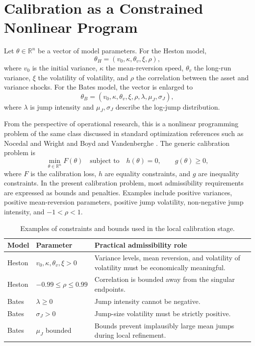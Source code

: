 \documentclass[a4paper,10pt,titlepage,oneside,openany]{book}
\theoremstyle{plain}
\theoremstyle{definition}
\theoremstyle{remark}
\newcommand{\R}{\mathbb{R}}
\begin{document}
\section{Calibration as a Constrained Nonlinear Program}

Let \(\theta\in\R^n\) be a vector of model parameters. For the Heston model,
\[
    \theta_H=(v_0,\kappa,\theta_v,\xi,\rho),
\]
where \(v_0\) is the initial variance, \(\kappa\) the mean-reversion speed, \(\theta_v\) the long-run variance, \(\xi\) the volatility of volatility, and \(\rho\) the correlation between the asset and variance shocks. For the Bates model, the vector is enlarged to
\[
    \theta_B=(v_0,\kappa,\theta_v,\xi,\rho,\lambda,\mu_J,\sigma_J),
\]
where \(\lambda\) is jump intensity and \(\mu_J,\sigma_J\) describe the log-jump distribution.

From the perspective of operational research, this is a nonlinear programming problem of the same class discussed in standard optimization references such as Nocedal and Wright and Boyd and Vandenberghe \cite{NocedalWright2006,BoydVandenberghe2004}. The generic calibration problem is
\begin{equation}
    \min_{\theta\in\R^n} F(\theta)
    \quad\text{subject to}\quad
    h(\theta)=0,\qquad g(\theta)\geq 0,
    \label{eq:generic-nlp}
\end{equation}
where \(F\) is the calibration loss, \(h\) are equality constraints, and \(g\) are inequality constraints. In the present calibration problem, most admissibility requirements are expressed as bounds and penalties. Examples include positive variances, positive mean-reversion parameters, positive jump volatility, non-negative jump intensity, and \(-1<\rho<1\).

\begin{table}[H]
\centering
\begin{tabularx}{\textwidth}{@{}p{3.3cm}p{3.2cm}X@{}}
\toprule
\textbf{Model} & \textbf{Parameter} & \textbf{Practical admissibility role} \\
\midrule
Heston & \(v_0,\kappa,\theta_v,\xi>0\) & Variance levels, mean reversion, and volatility of volatility must be economically meaningful. \\
Heston & \(-0.99\leq\rho\leq0.99\) & Correlation is bounded away from the singular endpoints. \\
Bates & \(\lambda\geq0\) & Jump intensity cannot be negative. \\
Bates & \(\sigma_J>0\) & Jump-size volatility must be strictly positive. \\
Bates & \(\mu_J\) bounded & Bounds prevent implausibly large mean jumps during local refinement. \\
\bottomrule
\end{tabularx}
\caption{Examples of constraints and bounds used in the local calibration stage.}
\label{tab:bounds}
\end{table}
\end{document}
